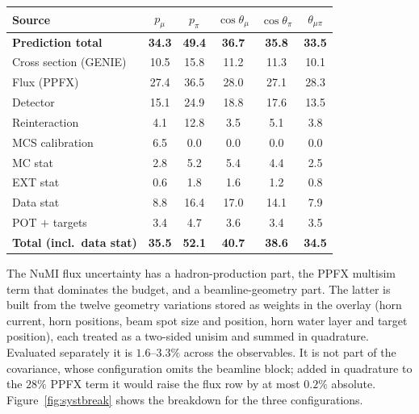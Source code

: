 \documentclass[11pt,a4paper]{article}
\begin{document}
\begin{center}\small
{}
\label{tab:systbreak}
\begin{tabular}{lccccc}
\toprule
Source & $p_\mu$ & $p_\pi$ & $\cos\theta_\mu$ & $\cos\theta_\pi$ & $\theta_{\mu\pi}$ \\
\midrule
\textbf{Prediction total} & \textbf{34.3} & \textbf{49.4} & \textbf{36.7} & \textbf{35.8} & \textbf{33.5} \\
Cross section (GENIE) & 10.5 & 15.8 & 11.2 & 11.3 & 10.1 \\
Flux (PPFX) & 27.4 & 36.5 & 28.0 & 27.1 & 28.3 \\
Detector & 15.1 & 24.9 & 18.8 & 17.6 & 13.5 \\
Reinteraction & 4.1 & 12.8 & 3.5 & 5.1 & 3.8 \\
MCS calibration & 6.5 & 0.0 & 0.0 & 0.0 & 0.0 \\
MC stat & 2.8 & 5.2 & 5.4 & 4.4 & 2.5 \\
EXT stat & 0.6 & 1.8 & 1.6 & 1.2 & 0.8 \\
Data stat & 8.8 & 16.4 & 17.0 & 14.1 & 7.9 \\
POT $+$ targets & 3.4 & 4.7 & 3.6 & 3.4 & 3.5 \\
\textbf{Total (incl.\ data stat)} & \textbf{35.5} & \textbf{52.1} & \textbf{40.7} & \textbf{38.6} & \textbf{34.5} \\
\bottomrule
\end{tabular}
\end{center}

\noindent The NuMI flux uncertainty has a hadron-production part, the PPFX multisim term that
dominates the budget, and a beamline-geometry part. The latter is built from the twelve geometry
variations stored as weights in the overlay (horn current, horn positions, beam spot size and
position, horn water layer and target position), each treated as a two-sided unisim and summed in
quadrature. Evaluated separately it is $1.6$--$3.3\%$ across the observables. It is not part of the
covariance, whose configuration omits the beamline block; added in quadrature to the $28\%$ PPFX
term it would raise the flux row by at most $0.2\%$ absolute. Figure~\ref{fig:systbreak} shows the
breakdown for the three configurations.
\end{document}
